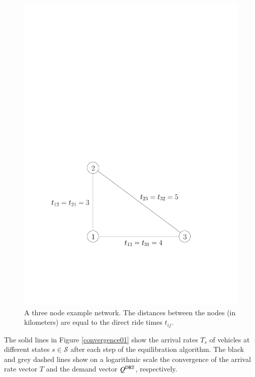 \documentclass[dissertation,draft*]{aaltoseries}
\begin{document}
\begin{figure}[ht]
\begin{center}
\includegraphics[width=0.6\columnwidth]{3node01}
\caption{A three node example network. The distances between the nodes 
(in kilometers) are equal to the direct ride times $t_{ij}$.}
\label{3node01}
\end{center}
\end{figure}

The solid lines in Figure \ref{convergence01} show the
arrival rates $T_s$ of vehicles at different states $s \in \mathcal{S}$ after each step of the equilibration algorithm. 
The black and grey dashed lines show on a logarithmic scale 
the convergence of the arrival rate vector $T$ and the demand vector $Q^{\rm DRT}$, respectively.
\end{document}
